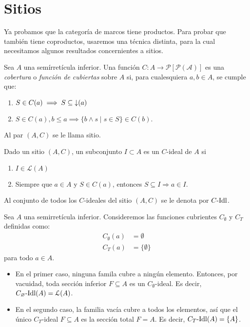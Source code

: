 \section{Sitios}

Ya probamos que la categoría de marcos tiene productos.
Para probar que también tiene coproductos,
usaremos una técnica distinta, para la cual necesitamos
algunos resultados concernientes a sitios.

\begin{definition}
    Sea $A$ una semírretícula inferior.
    Una función $C:A\to\mathcal{P}[\mathcal{P(A)}]$
    es una \textit{cobertura} o \textit{función de cubiertas}
    sobre $A$ si,
    para cualesquiera $a,b\in A$, se cumple que:
    \begin{enumerate}
        \item $S\in C(a) \implies S\subseteq{\downarrow}(a)$
        \item $S\in C(a), b\leq a \implies \{b\wedge s\mid s\in S\}\in C(b)$.
    \end{enumerate}
    Al par $(A,C)$ se le llama sitio.
\end{definition}
\begin{definition}[$C$-ideales]
    Dado un sitio $(A,C)$, un subconjunto
    $I\subset A$ es un $C$-ideal de $A$ si
    \begin{enumerate}
        \item $I\in\mathcal{L}(A)$
        \item Siempre que $a\in A$ y $S\in C(a)$, entonces
        $S\subseteq I\Rightarrow a\in I$.
    \end{enumerate}
    Al conjunto de todos los $C$-ideales del sitio $(A,C)$
    se le denota por $C\text{-}\mathrm{Idl}$.
\end{definition}
\begin{example}
    Sea $A$ una semirretícula inferior.
    Consideremos las funciones cubrientes 
    $C_\emptyset$ y $C_T$ definidas como:
    \begin{align*}
        C_\emptyset(a) &= \emptyset \\
        C_T(a) &= \{\emptyset\}
    \end{align*}
    para todo $a\in A$.
    \begin{itemize}
        \item
        En el primer caso,
        ninguna famila cubre a ningún elemento.
        Entonces, por vacuidad,
        toda sección inferior $F\subseteq A$ es
        un $C_\emptyset$-ideal.
        Es decir, $C_\varnothing\text{-}\mathrm{Idl}(A)=\mathcal{L}(A)$.
        \item
        En el segundo caso,
        la familia vacía cubre a todos los elementos,
        así que el único $C_T$-ideal $F\subseteq A$
        es la sección total $F=A$.
        Es decir, $C_T\text{-}\mathrm{Idl}(A)=\{A\}$.
    \end{itemize}
\end{example}

